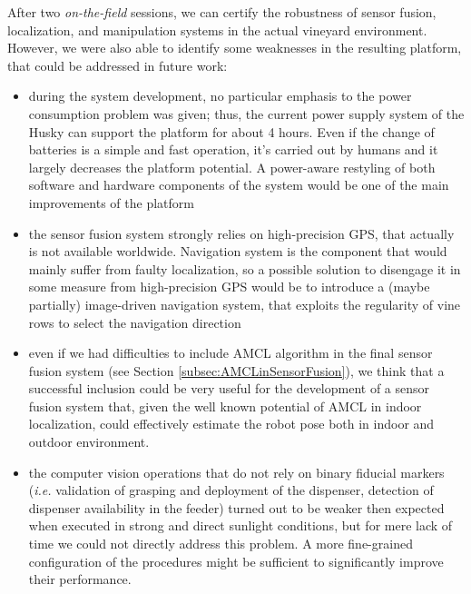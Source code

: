 After two \textit{on-the-field} sessions, we can certify the robustness of sensor fusion, localization, and manipulation systems in the actual vineyard environment. However, we were also able to identify some weaknesses in the resulting platform, that could be addressed in future work:
\begin{itemize}
	\item during the system development, no particular emphasis to the power consumption problem was given; thus, the current power supply system of the Husky can support the platform for about 4 hours. Even if the change of batteries is a simple and fast operation, it's carried out by humans and it largely decreases the platform potential. A power-aware restyling of both software and hardware components of the system would be one of the main improvements of the platform
	\item the sensor fusion system strongly relies on high-precision GPS, that actually is not available worldwide. Navigation system is the component that would mainly suffer from faulty localization, so a possible solution to disengage it in some measure from high-precision GPS would be to introduce a (maybe partially) image-driven navigation system, that exploits the regularity of vine rows to select the navigation direction
	\item even if we had difficulties to include \ac{AMCL} algorithm in the final sensor fusion system (see Section \ref{subsec:AMCLinSensorFusion}), we think that a successful inclusion could be very useful for the development of a sensor fusion system that, given the well known potential of \ac{AMCL} in indoor localization, could effectively estimate the robot pose both in indoor and outdoor environment.
	\item the computer vision operations that do not rely on binary fiducial markers (\textit{i.e.} validation of grasping and deployment of the dispenser, detection of dispenser availability in the feeder) turned out to be weaker then expected when executed in strong and direct sunlight conditions, but for mere lack of time we could not directly address this problem. A more fine-grained configuration of the procedures might be sufficient to significantly improve their performance.
\end{itemize}





